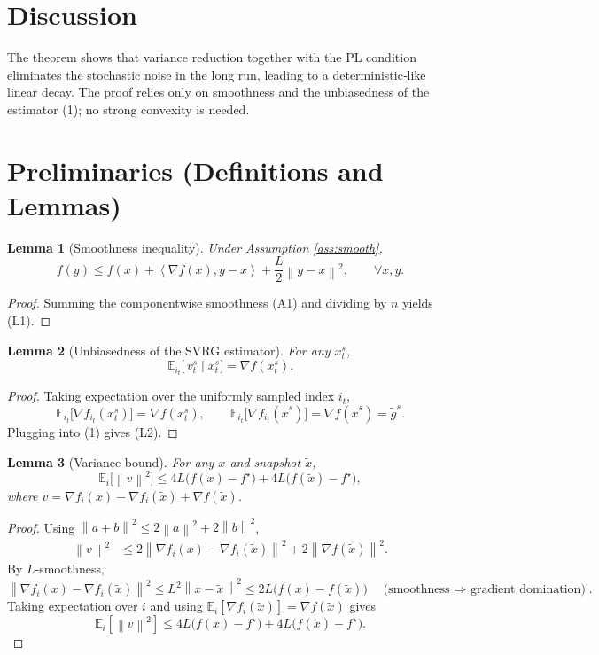\documentclass{article}
\newcommand{\E}{\mathbb{E}}
\newcommand{\norm}[1]{\left\|#1\right\|}
\newcommand{\inner}[2]{\left\langle #1,#2\right\rangle}
\newtheorem{lemma}{Lemma}
\begin{document}
\section*{Discussion}
The theorem shows that variance reduction together with the PL condition
eliminates the stochastic noise in the long run, leading to a deterministic‑like
linear decay.  The proof relies only on smoothness and the unbiasedness of the
estimator (1); no strong convexity is needed.

\section*{Preliminaries (Definitions and Lemmas)}
\begin{lemma}[Smoothness inequality]\label{lem:smooth}
Under Assumption \ref{ass:smooth},
\[
f(y)\le f(x)+\inner{\nabla f(x)}{y-x}+\frac{L}{2}\norm{y-x}^{2},
\qquad \forall x,y.
\tag{L1}
\]
\end{lemma}
\begin{proof}
Summing the componentwise smoothness (A1) and dividing by $n$ yields (L1). \qedhere
\end{proof}

\begin{lemma}[Unbiasedness of the SVRG estimator]\label{lem:unbiased}
For any $x_t^{s}$,
\[
\E_{i_t}\!\bigl[\,v_t^{s}\mid x_t^{s}\bigr]=\nabla f(x_t^{s}).
\tag{L2}
\]
\end{lemma}
\begin{proof}
Taking expectation over the uniformly sampled index $i_t$,
\[
\E_{i_t}\!\bigl[\nabla f_{i_t}(x_t^{s})\bigr]=\nabla f(x_t^{s}),\qquad
\E_{i_t}\!\bigl[\nabla f_{i_t}(\tilde{x}^{s})\bigr]=\nabla f(\tilde{x}^{s})=\tilde{g}^{s}.
\]
Plugging into (1) gives (L2). \qedhere
\end{proof}

\begin{lemma}[Variance bound]\label{lem:var}
For any $x$ and snapshot $\tilde{x}$,
\[
\E_{i}\!\bigl[\norm{v}^{2}\bigr]\le 4L\bigl(f(x)-f^{\star}\bigr)
        +4L\bigl(f(\tilde{x})-f^{\star}\bigr),
\tag{L3}
\]
where $v=\nabla f_{i}(x)-\nabla f_{i}(\tilde{x})+\nabla f(\tilde{x})$.
\end{lemma}
\begin{proof}
Using $\norm{a+b}^{2}\le 2\norm{a}^{2}+2\norm{b}^{2}$,
\[
\begin{aligned}
\norm{v}^{2}
&\le 2\norm{\nabla f_{i}(x)-\nabla f_{i}(\tilde{x})}^{2}
      +2\norm{\nabla f(\tilde{x})}^{2}.
\end{aligned}
\]
By $L$‑smoothness,
\[
\norm{\nabla f_{i}(x)-\nabla f_{i}(\tilde{x})}^{2}
\le L^{2}\norm{x-\tilde{x}}^{2}
\le 2L\bigl(f(x)-f(\tilde{x})\bigr)  \quad\text{(smoothness $\Rightarrow$ gradient domination)}.
\]
Taking expectation over $i$ and using $\E_i[\nabla f_i(\tilde{x})]=\nabla f(\tilde{x})$ gives
\[
\E_i[\norm{v}^{2}]
\le 4L\bigl(f(x)-f^{\star}\bigr)+4L\bigl(f(\tilde{x})-f^{\star}\bigr).
\]
\qedhere
\end{proof}
\end{document}
